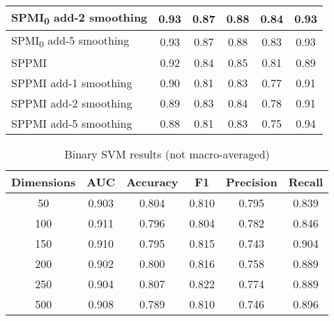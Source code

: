 \documentclass{article}
\begin{document}
\begin{table}[htp]
\begin{tabular}{|l|c|c|c|c|c|}
    \hline
    \cellcolor{green} SPMI\textsubscript{0} add-2 smoothing & \cellcolor{green} 0.93 & \cellcolor{green} 0.87 & \cellcolor{green} 0.88 & \cellcolor{green} 0.84 & 0.93 \\
    \hline
    SPMI\textsubscript{0} add-5 smoothing & \cellcolor{green} 0.93 & \cellcolor{green} 0.87 & \cellcolor{green} 0.88 & 0.83 & 0.93 \\
    \hline
    SPPMI & 0.92 & 0.84 & 0.85 & 0.81 & 0.89 \\
    \hline
    SPPMI add-1 smoothing & 0.90 & 0.81 & 0.83 & 0.77 & 0.91 \\
    \hline
    SPPMI add-2 smoothing & 0.89 & 0.83 & 0.84 & 0.78 & 0.91 \\
    \hline
    SPPMI add-5 smoothing & 0.88 & 0.81 & 0.83 & 0.75 & \cellcolor{green} 0.94 \\
    \hline
  \end{tabular}
  \label{tab:wemb500}
\end{table}

\begin{table}[htp]
 \caption{Binary SVM results (not macro-averaged)}
  \centering
  \begin{tabular}{|c|c|c|c|c|c|}
    \hline
    \rowcolor{lightgray} \textbf{Dimensions} & \textbf{AUC} & \textbf{Accuracy} & \textbf{F1} & \textbf{Precision} & \textbf{Recall} \\
    \hline
    50 & 0.903 & 0.804 & 0.810 & \cellcolor{green} 0.795 & 0.839 \\
    \hline
    100 & \cellcolor{green} 0.911 & 0.796 & 0.804 & 0.782 & 0.846 \\
    \hline
    150 & 0.910 & 0.795 & 0.815 & 0.743 & \cellcolor{green} 0.904 \\
    \hline
    200 & 0.902 & 0.800 & 0.816 & 0.758 & 0.889 \\
    \hline
    \cellcolor{green} 250 & 0.904 & \cellcolor{green} 0.807 & \cellcolor{green} 0.822 & 0.774 & 0.889 \\
    \hline
    500 & 0.908 & 0.789 & 0.810 & 0.746 & 0.896 \\
    \hline
  \end{tabular}
  \label{tab:svm_nomacro}
\end{table}



\end{document}
